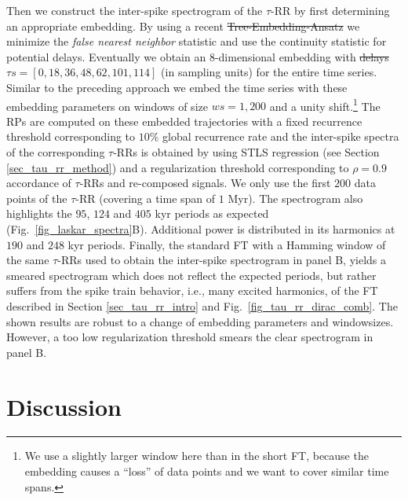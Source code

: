 \documentclass[entropy,article,submit,pdftex,moreauthors]{Definitions/mdpi}
\providecommand{\DIFadd}[1]{{\protect\color{blue}\uwave{#1}}} %
\providecommand{\DIFdel}[1]{{\protect\color{red}\sout{#1}}}                      %
\providecommand{\DIFaddbegin}{} %
\providecommand{\DIFaddend}{} %
\providecommand{\DIFdelbegin}{} %
\providecommand{\DIFdelend}{} %
\begin{document}
\noindent Then we construct the inter-spike spectrogram of the $\tau$-RR by first determining an appropriate embedding. By using a recent \DIFdelbegin \DIFdel{Tree-Embedding-Ansatz }\DIFdelend \DIFaddbegin \DIFadd{tree-embedding ansatz }\DIFaddend \cite{Kraemer2022} we minimize the 
\textit{false nearest neighbor} statistic \cite{hegger1999} and use the continuity statistic \cite{pecora2007} for potential delays. Eventually we obtain an $8$-dimensional embedding 
with \DIFdelbegin \DIFdel{delays $\tau s=[0, 18, 36, 48, 62, 101, 114]$ }\DIFdelend \DIFaddbegin \DIFadd{embedding delays $\tau =[0, 18, 36, 48, 62, 101, 114]$ }\DIFaddend (in sampling units) for the entire time series. Similar to the preceding approach we embed the time series with these embedding parameters 
on windows of size $ws=1,200$ and a unity shift.\footnote{We use a slightly larger window here than in the short FT, because the embedding causes a ``loss'' of data points and we want to 
cover similar time spans.} The RPs are computed on these embedded trajectories with a fixed recurrence threshold corresponding to $10\%$ global recurrence rate \cite{kraemer2018} 
and the inter-spike spectra of the corresponding $\tau$-RRs is obtained by using STLS regression (see Section \ref{sec_tau_rr_method}) and a regularization threshold corresponding to 
$\rho=0.9$ accordance of $\tau$-RRs and re-composed signals. We only use the first $200$ data points of the $\tau$-RR (covering a time span of $1$ Myr). 
The spectrogram also highlights the $95$, $124$ and $405$ kyr periods as expected (Fig.~\ref{fig_laskar_spectra}B). 
Additional power is distributed in its harmonics at $190$ and $248$ kyr periods. Finally, the standard FT with a Hamming window of the same $\tau$-RRs used to obtain the inter-spike 
spectrogram in panel B, yields a smeared spectrogram which does not reflect the expected periods, but rather suffers from the spike train behavior, i.e., many excited harmonics, of the 
FT described in Section \ref{sec_tau_rr_intro} and Fig.~\ref{fig_tau_rr_dirac_comb}. The shown results are robust to a change of embedding parameters and windowsizes. However, a too low 
regularization threshold smears the clear spectrogram in panel B.


\section{Discussion}\label{sec_tau_rr_discussion}
\end{document}
